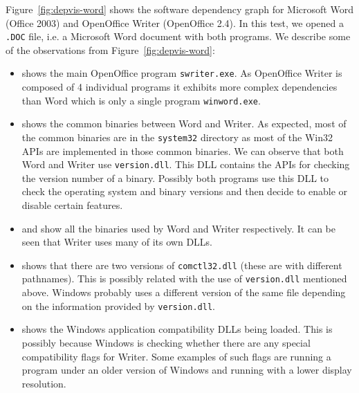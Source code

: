 Figure~\ref{fig:depvis-word} shows the software dependency graph for Microsoft Word
(Office 2003) and OpenOffice Writer (OpenOffice 2.4).
In this test, we opened a {\tt .DOC} file, i.e. a Microsoft Word document
with both programs.
We describe some of the observations from Figure~\ref{fig:depvis-word}:

\begin{itemize}

\item {} shows the main OpenOffice program
\texttt{swriter.exe}.
As OpenOffice Writer is composed of 4 individual programs it
exhibits more complex dependencies than
Word which is only a single program \texttt{winword.exe}.

\item {} shows the common binaries between Word and Writer.
As expected, most of the common binaries
are in the \texttt{system32} directory as
most of the Win32 APIs are implemented in those common binaries.
We can observe that both Word and Writer use \texttt{version.dll}.
This DLL contains the APIs for checking the version number of a binary.
Possibly both programs use this DLL to check the operating system and
binary versions and then decide to enable or disable certain features.

\item {} and  show all the binaries
used by Word and Writer respectively. It can be seen that Writer
uses many of its own DLLs.

\item {} shows that there are two
versions of \texttt{comctl32.dll}
(these are with different pathnames). This is possibly related
with the use of \texttt{version.dll} mentioned above.
Windows probably uses a different version of the
same file depending on the information provided by \texttt{version.dll}.

\item {} shows the Windows application
compatibility DLLs being loaded.
This is possibly because Windows is checking whether there are any special
compatibility flags for Writer.
Some examples of such flags are running a program under an older version of
Windows and running with a lower display resolution.

\end{itemize}

